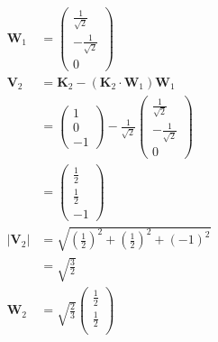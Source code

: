 \documentclass{article}
\begin{document}
\begin{enumerate}
        \begin{align*}
          \mathbf{W}_1   & = \begin{pmatrix}
                               \frac{1}{\sqrt{2}}  \\
                               -\frac{1}{\sqrt{2}} \\
                               0
                             \end{pmatrix}                                          \\
          \mathbf{V}_2   & = \mathbf{K}_2 - (\mathbf{K}_2 \cdot \mathbf{W}_1) \mathbf{W}_1               \\
                         & = \begin{pmatrix}
                               1 \\
                               0 \\
                               -1
                             \end{pmatrix} - \frac{1}{\sqrt{2}} \begin{pmatrix}
                                                                  \frac{1}{\sqrt{2}}  \\
                                                                  -\frac{1}{\sqrt{2}} \\
                                                                  0
                                                                \end{pmatrix}       \\
                         & = \begin{pmatrix}
                               \frac{1}{2} \\
                               \frac{1}{2} \\
                               -1
                             \end{pmatrix}                                                              \\
          |\mathbf{V}_2| & = \sqrt{\left( \frac{1}{2} \right)^2 + \left( \frac{1}{2} \right)^2 + (-1)^2} \\
                         & = \sqrt{\frac{3}{2}}                                                          \\
          \mathbf{W}_2   & = \sqrt{\frac{2}{3}} \begin{pmatrix}
                                                  \frac{1}{2} \\
                                                  \frac{1}{2} \\

\end{pmatrix}
\end{align*}
\end{enumerate}
\end{document}
